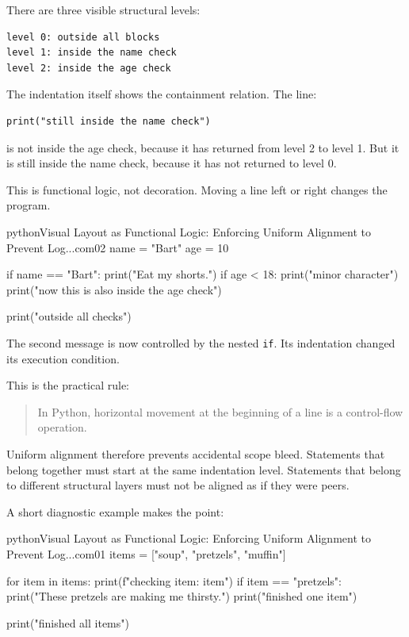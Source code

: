 \documentclass[a4paper,twoside]{report}
\begin{document}
There are three visible structural levels:

\begin{verbatim}
level 0: outside all blocks
level 1: inside the name check
level 2: inside the age check
\end{verbatim}

The indentation itself shows the containment relation. The line:

\begin{verbatim}
print("still inside the name check")
\end{verbatim}

is not inside the age check, because it has returned from level 2 to level 1. But it is still inside the name check, because it has not returned to level 0.

This is functional logic, not decoration. Moving a line left or right changes the program.

\begin{codebox}[]{python}{Visual Layout as Functional Logic: Enforcing Uniform Alignment to Prevent Log...}{com02}
name = "Bart"
age = 10

if name == "Bart":
    print("Eat my shorts.")
    if age < 18:
        print("minor character")
        print("now this is also inside the age check")

print("outside all checks")
\end{codebox}


The second message is now controlled by the nested \texttt{if}. Its indentation changed its execution condition.

This is the practical rule:

\begin{quote}
In Python, horizontal movement at the beginning of a line is a control-flow operation.
\end{quote}

Uniform alignment therefore prevents accidental scope bleed. Statements that belong together must start at the same indentation level. Statements that belong to different structural layers must not be aligned as if they were peers.

A short diagnostic example makes the point:

\begin{codebox}[]{python}{Visual Layout as Functional Logic: Enforcing Uniform Alignment to Prevent Log...}{com01}
items = ["soup", "pretzels", "muffin"]

for item in items:
    print(f"checking item: {item}")
    if item == "pretzels":
        print("These pretzels are making me thirsty.")
    print("finished one item")

print("finished all items")
\end{codebox}
\end{document}
